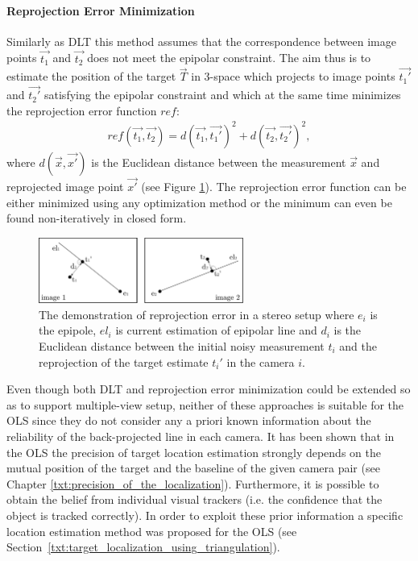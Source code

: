 \paragraph{Reprojection Error Minimization} Similarly as DLT this method assumes that the correspondence between image points $\vec{t_{1}}$ and $\vec{t_{2}}$ does not meet the epipolar constraint. The aim thus is to estimate the position of the target $\vec{T}$ in 3-space which projects to image points $\vec{t_{1}'}$ and $\vec{t_{2}'}$ satisfying the epipolar constraint and which at the same time minimizes the reprojection error function $ref$:
\begin{align}
	ref(\vec{t_{1}}, \vec{t_{2}}) = d(\vec{t_{1}}, \vec{t_{1}'})^{2} + d(\vec{t_{2}}, \vec{t_{2}'})^{2},
\end{align}
where $d(\vec{x}, \vec{x'})$ is the Euclidean distance between the measurement $\vec{x}$ and reprojected image point $\vec{x'}$ (see Figure \ref{fig:reprojection}). The reprojection error function can be either minimized using any optimization method or the minimum can even be found non-iteratively in closed form.

\begin{figure}[tbh]
	\centering
	\includegraphics[width=0.6\textwidth]{fig/reprojection.pdf}
	\caption{The demonstration of reprojection error in a stereo setup where $e_{i}$ is the epipole, $el_{i}$ is current estimation of epipolar line and $d_{i}$ is the Euclidean distance between the initial noisy measurement $t_{i}$ and the reprojection of the target estimate $t_{i}'$ in the camera $i$.}
	\label{fig:reprojection}
\end{figure}

Even though both DLT and reprojection error minimization could be extended so as to support multiple-view setup, neither of these approaches is suitable for the OLS since they do not consider any a priori known information about the reliability of the back-projected line in each camera. It has been shown that in the OLS the precision of target location estimation strongly depends on the mutual position of the target and the baseline of the given camera pair (see Chapter \ref{txt:precision_of_the_localization}). Furthermore, it is possible to obtain the belief from individual visual trackers (i.e. the confidence that the object is tracked correctly). In order to exploit these prior information a specific location estimation method was proposed for the OLS (see Section~\ref{txt:target_localization_using_triangulation}).

